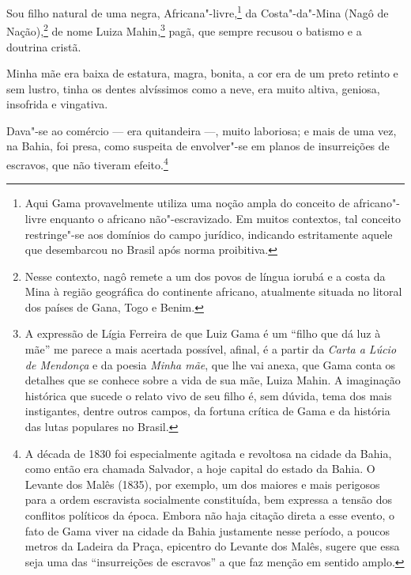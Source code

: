 Sou filho natural de uma negra, Africana"-livre,\footnote{Aqui Gama
  provavelmente utiliza uma noção ampla do conceito de africano"-livre
  enquanto o africano não"-escravizado. Em muitos contextos, tal conceito
  restringe"-se aos domínios do campo jurídico, indicando estritamente
  aquele que desembarcou no Brasil após norma proibitiva.} da
Costa"-da"-Mina (Nagô de Nação),\footnote{Nesse contexto, nagô remete a
  um dos povos de língua iorubá e a costa da Mina à região geográfica do
  continente africano, atualmente situada no litoral dos países de Gana,
  Togo e Benim.} de nome Luiza Mahin,\footnote{A expressão de Lígia
  Ferreira de que Luiz Gama é um ``filho que dá luz à mãe'' me parece a
  mais acertada possível, afinal, é a partir da \emph{Carta a Lúcio de
  Mendonça} e da poesia \emph{Minha mãe}, que lhe vai anexa, que Gama
  conta os detalhes que se conhece sobre a vida de sua mãe, Luiza Mahin.
  A imaginação histórica que sucede o relato vivo de seu filho é, sem
  dúvida, tema dos mais instigantes, dentre outros campos, da fortuna
  crítica de Gama e da história das lutas populares no Brasil.} pagã,
que sempre recusou o batismo e a doutrina cristã.

Minha mãe era baixa de estatura, magra, bonita, a cor era de um preto
retinto e sem lustro, tinha os dentes alvíssimos como a neve, era muito
altiva, geniosa, insofrida e vingativa.

Dava"-se ao comércio --- era quitandeira ---, muito laboriosa; e mais de
uma vez, na Bahia, foi presa, como suspeita de envolver"-se em planos de
insurreições de escravos, que não tiveram efeito.\footnote{A década de
  1830 foi especialmente agitada e revoltosa na cidade da Bahia, como
  então era chamada Salvador, a hoje capital do estado da Bahia. O
  Levante dos Malês (1835), por exemplo, um dos maiores e mais perigosos
  para a ordem escravista socialmente constituída, bem expressa a tensão
  dos conflitos políticos da época. Embora não haja citação direta a
  esse evento, o fato de Gama viver na cidade da Bahia justamente nesse
  período, a poucos metros da Ladeira da Praça, epicentro do Levante dos
  Malês, sugere que essa seja uma das ``insurreições de escravos'' a que
  faz menção em sentido amplo.}


